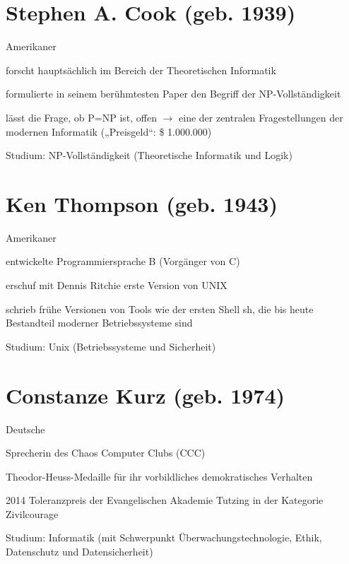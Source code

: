 \documentclass[a4paper,12pt]{report}
\begin{document}
\section*{Stephen A. Cook (geb. 1939)}
\begin{itemize*}
    \item Amerikaner
    \item forscht hauptsächlich im Bereich der Theoretischen Informatik
    \item formulierte in seinem berühmtesten Paper den Begriff der NP-Vollständigkeit
    \item lässt die Frage, ob P=NP ist, offen $\rightarrow$ eine der zentralen Fragestellungen
          der modernen Informatik („Preisgeld“: \$ 1.000.000)
    \item Studium: NP-Vollständigkeit (Theoretische Informatik und Logik)
\end{itemize*}

\section*{Ken Thompson (geb. 1943)}
\begin{itemize*}
    \item Amerikaner
    \item entwickelte Programmiersprache B (Vorgänger von C)
    \item erschuf mit Dennis Ritchie erste Version von UNIX
    \item schrieb frühe Versionen von Tools wie der ersten Shell sh, die bis heute Bestandteil
          moderner Betriebssysteme sind
    \item Studium: Unix (Betriebssysteme und Sicherheit)
\end{itemize*}

\section*{Constanze Kurz (geb. 1974)}
\begin{itemize*}
    \item Deutsche 
    \item Sprecherin des Chaos Computer Clubs (CCC)
    \item Theodor-Heuss-Medaille für ihr vorbildliches demokratisches Verhalten
    \item 2014 Toleranzpreis der Evangelischen Akademie Tutzing in der Kategorie Zivilcourage
    \item Studium: Informatik (mit Schwerpunkt Überwachungstechnologie, Ethik, Datenschutz und Datensicherheit)
\end{itemize*}
\end{document}
